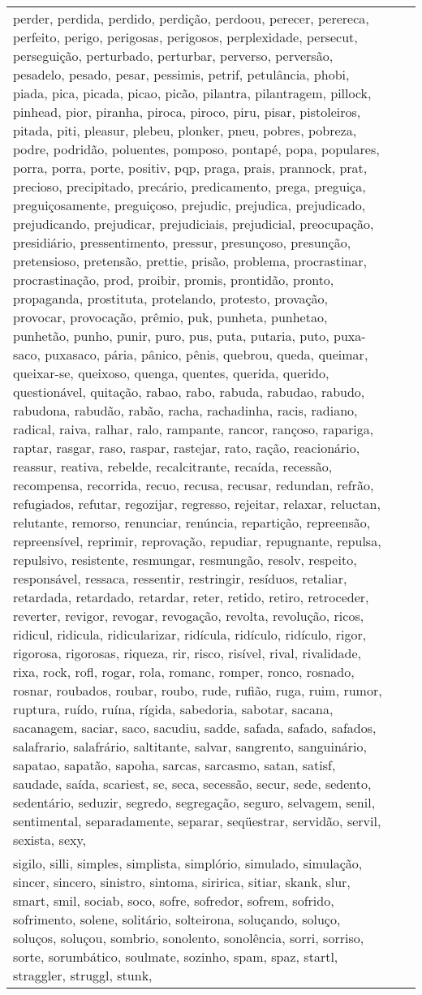 \begin{longtable}{|*3{p{15cm}|}}
perder, perdida, perdido, perdição, perdoou, perecer, perereca, perfeito, perigo, perigosas, perigosos, perplexidade, persecut, perseguição, perturbado, perturbar, perverso, perversão, pesadelo, pesado, pesar, pessimis, petrif, petulância, phobi, piada, pica, picada, picao, picão, pilantra, pilantragem, pillock, pinhead, pior, piranha, piroca, piroco, piru, pisar, pistoleiros, pitada, piti, pleasur, plebeu, plonker, pneu, pobres, pobreza, podre, podridão, poluentes, pomposo, pontapé, popa, populares, porra, porra, porte, positiv, pqp, praga, prais, prannock, prat, precioso, precipitado, precário, predicamento, prega, preguiça, preguiçosamente, preguiçoso, prejudic, prejudica, prejudicado, prejudicando, prejudicar, prejudiciais, prejudicial, preocupação, presidiário, pressentimento, pressur, presunçoso, presunção, pretensioso, pretensão, prettie, prisão, problema, procrastinar, procrastinação, prod, proibir, promis, prontidão, pronto, propaganda, prostituta, protelando, protesto, provação, provocar, provocação, prêmio, puk, punheta, punhetao, punhetão, punho, punir, puro, pus, puta, putaria, puto, puxa-saco, puxasaco, pária, pânico, pênis, quebrou, queda, queimar, queixar-se, queixoso, quenga, quentes, querida, querido, questionável, quitação, rabao, rabo, rabuda, rabudao, rabudo, rabudona, rabudão, rabão, racha, rachadinha, racis, radiano, radical, raiva, ralhar, ralo, rampante, rancor, rançoso, rapariga, raptar, rasgar, raso, raspar, rastejar, rato, ração, reacionário, reassur, reativa, rebelde, recalcitrante, recaída, recessão, recompensa, recorrida, recuo, recusa, recusar, redundan, refrão, refugiados, refutar, regozijar, regresso, rejeitar, relaxar, reluctan, relutante, remorso, renunciar, renúncia, repartição, repreensão, repreensível, reprimir, reprovação, repudiar, repugnante, repulsa, repulsivo, resistente, resmungar, resmungão, resolv, respeito, responsável, ressaca, ressentir, restringir, resíduos, retaliar, retardada, retardado, retardar, reter, retido, retiro, retroceder, reverter, revigor, revogar, revogação, revolta, revolução, ricos, ridicul, ridicula, ridicularizar, ridícula, ridículo, ridículo, rigor, rigorosa, rigorosas, riqueza, rir, risco, risível, rival, rivalidade, rixa, rock, rofl, rogar, rola, romanc, romper, ronco, rosnado, rosnar, roubados, roubar, roubo, rude, rufião, ruga, ruim, rumor, ruptura, ruído, ruína, rígida, sabedoria, sabotar, sacana, sacanagem, saciar, saco, sacudiu, sadde, safada, safado, safados, salafrario, salafrário, saltitante, salvar, sangrento, sanguinário, sapatao, sapatão, sapoha, sarcas, sarcasmo, satan, satisf, saudade, saída, scariest, se, seca, secessão, secur, sede, sedento, sedentário, seduzir, segredo, segregação, seguro, selvagem, senil, sentimental, separadamente, separar, seqüestrar, servidão, servil, sexista, sexy, \\ sigilo, silli, simples, simplista, simplório, simulado, simulação, sincer, sincero, sinistro, sintoma, siririca, sitiar, skank, slur, smart, smil, sociab, soco, sofre, sofredor, sofrem, sofrido, sofrimento, solene, solitário, solteirona, soluçando, soluço, soluços, soluçou, sombrio, sonolento, sonolência, sorri, sorriso, sorte, sorumbático, soulmate, sozinho, spam, spaz, startl, straggler, struggl, stunk, 
\end{longtable}

